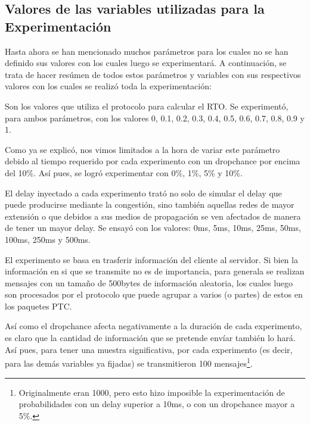 \subsection{Valores de las variables utilizadas para la Experimentaci\'on}\label{sec:variables_metricas:variables}
\par Hasta ahora se han mencionado muchos par\'ametros para los cuales no se han
definido sus valores con los cuales luego se experimentar\'a. A continuaci\'on,
se trata de hacer res\'umen de todos estos par\'ametros y variables con sus
respectivos valores con los cuales se realiz\'o toda la experimentaci\'on:

\begin{description}

    \bigskip
    \item[$\alpha$/$\beta$:] Son los valores que utiliza el protocolo para
        calcular el RTO. Se experiment\'o, para ambos par\'ametros, con los
        valores 0, 0.1, 0.2, 0.3, 0.4, 0.5, 0.6, 0.7, 0.8, 0.9 y 1.

    \bigskip
    \item[DropChance ($\phi$):] Como ya se explic\'o, nos vimos limitados a la
        hora de variar este par\'ametro debido al tiempo requerido por cada
        experimento con un dropchance por encima del 10\%. As\'i pues, se
        logr\'o experimentar con 0\%, 1\%, 5\% y 10\%.

    \bigskip
    \item[Delay ($\delta$):] El delay inyectado a cada experimento trat\'o no
        solo de simular el delay que puede producirse mediante la congesti\'on,
        sino tambi\'en aquellas redes de mayor extensi\'on o que debidos a sus
        medios de propagaci\'on se ven afectados de manera de tener un mayor
        delay. Se ensay\'o con los valores: 0ms, 5ms, 10ms, 25ms, 50ms, 100ms,
        250ms y 500ms.

    \bigskip
    \item[Tama\~no los mensajes:] El experimento se basa en trasferir
        informaci\'on del cliente al servidor. Si bien la informaci\'on en si
        que se transmite no es de importancia, para generala se realizan
        mensajes con un tama\~no de 500bytes de informaci\'on aleatoria, los
        cuales luego son procesados por el protocolo que puede agrupar a varios
        (o partes) de estos en los paquetes PTC.

    \bigskip
    \item[Cantidad de mensajes:] As\'i como el dropchance afecta negativamente a
        la duraci\'on de cada experimento, es claro que la cantidad de
        informaci\'on que se pretende env\'iar tambi\'en lo har\'a. As\'i pues,
        para tener una muestra significativa, por cada experimento (es decir,
        para las dem\'as variables ya fijadas) se transmitieron 100
        mensajes\footnote{Originalmente eran 1000, pero esto hizo imposible la
        experimentaci\'on de probabilidades con un delay superior a 10ms, o con
        un dropchance mayor a 5\%.}.

\end{description}

